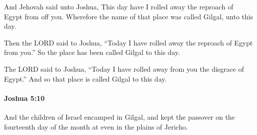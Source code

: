			\begin{versebox}
					\item[BHS] 
					\item[ASV] And Jehovah said unto Joshua, This day have I rolled away the reproach of Egypt from off you. Wherefore the name of that place was called Gilgal, unto this day.
					\item[NIV] Then the LORD said to Joshua, “Today I have rolled away the reproach of Egypt from you.” So the place has been called Gilgal to this day.
					\item[NRSV] The LORD said to Joshua, “Today I have rolled away from you the disgrace of Egypt.” And so that place is called Gilgal to this day.
			\end{versebox}

		\paragraph{Joshua 5:10} %
			\label{JOSHUA-5-10}

			And the children of Israel encamped in Gilgal, and kept the passover on the fourteenth day of the month at even in the plains of Jericho.

